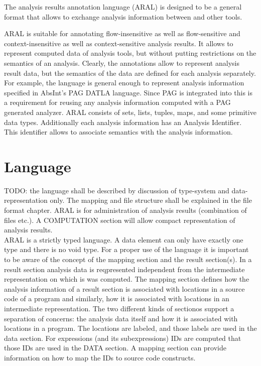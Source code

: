 The analysis results annotation language (ARAL) is designed to be a
general format that allows to exchange analysis information between
\satire{} and other tools. 


ARAL is suitable for annotating flow-insensitive as well as
flow-sensitive and context-insensitive as well as context-sensitive
analysis results. It allows to represent computed data of analysis
tools, but without putting restrictions on the semantics of an
analysis. Clearly, the annotations allow to represent analysis result
data, but the semantics of the data are defined for each analysis
separately. For example, the language is general enough to represent
analysis information specified in AbsInt's PAG DATLA language. Since
PAG is integrated into \satire{} this is a requirement for reusing any
analysis information computed with a PAG generated analyzer. ARAL
consists of sets, lists, tuples, maps, and some primitive data
types. Additionally each analysis information has an Analysis
Identifier. This identifier allows to associate semantics with the
analysis information.



\chapter{Language}

TODO: the language shall be described by discussion of type-system
and data-representation only. The mapping and file structure shall be
explained in the file format chapter. ARAL is for administration
of analysis results (combination of files etc.). A COMPUTATION section will allow compact representation of analysis results.\\

ARAL is a strictly typed language. A data element can only have
exactly one type and there is no void type. For a proper use of the
language it is important to be aware of the concept of the mapping
section and the result section(s). In a result section analysis data
is reqpresented independent from the intermediate representation on
which is was computed. The mapping section defines how the analysis
information of a result section is associated with locations in a
source code of a program and similarly, how it is associated with
locations in an intermediate representation. The two different kinds
of sectionos support a separation of concerns: the analysis data
itself and how it is associated with locations in a program. The
locations are labeled, and those labels are used in the data
section. For expressions (and its subexpressions) IDs are computed
that those IDs are used in the DATA section. A mapping section can
provide information on how to map the IDs to source code constructs.

